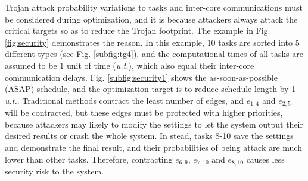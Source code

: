 \documentclass[10pt,journal]{IEEEtran}
\begin{document}
Trojan attack probability variations to tasks and inter-core communications must be considered during optimization, and it is because attackers always attack the critical targets so as to reduce the Trojan footprint. The example in Fig. \ref{fig:security} demonstrates the reason. In this example, 10 tasks are sorted into 5 different types (see Fig. \ref{subfig:tg4}), and the computational times of all tasks are assumed to be 1 unit of time (\textit{u.t.}), which also equal their inter-core communication delays. Fig. \ref{subfig:security1} shows the as-soon-as-possible (ASAP) schedule, and the optimization target is to reduce schedule length by 1 \textit{u.t.}. Traditional methods contract the least number of edges, and $e_{1,4}$ and $e_{2,5}$ will be contracted, but these edges must be protected with higher priorities, because attackers may likely to modify the settings to let the system output their desired results or crash the whole system. In stead, tasks 8-10 save the settings and demonstrate the final result, and their probabilities of being attack are much lower than other tasks. Therefore, contracting $e_{6,9}$, $e_{7,10}$ and $e_{8,10}$ causes less security risk to the system.
\end{document}
